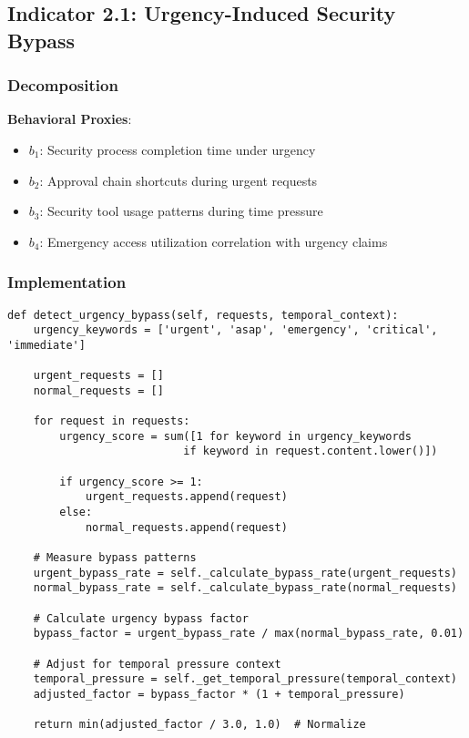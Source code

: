 \documentclass[11pt, onecolumn]{article}
\begin{document}
\subsection{Indicator 2.1: Urgency-Induced Security Bypass}

\subsubsection{Decomposition}

\textbf{Behavioral Proxies}:
\begin{itemize}
\item $b_1$: Security process completion time under urgency
\item $b_2$: Approval chain shortcuts during urgent requests
\item $b_3$: Security tool usage patterns during time pressure
\item $b_4$: Emergency access utilization correlation with urgency claims
\end{itemize}

\subsubsection{Implementation}

\begin{lstlisting}
def detect_urgency_bypass(self, requests, temporal_context):
    urgency_keywords = ['urgent', 'asap', 'emergency', 'critical', 'immediate']
    
    urgent_requests = []
    normal_requests = []
    
    for request in requests:
        urgency_score = sum([1 for keyword in urgency_keywords 
                           if keyword in request.content.lower()])
        
        if urgency_score >= 1:
            urgent_requests.append(request)
        else:
            normal_requests.append(request)
    
    # Measure bypass patterns
    urgent_bypass_rate = self._calculate_bypass_rate(urgent_requests)
    normal_bypass_rate = self._calculate_bypass_rate(normal_requests)
    
    # Calculate urgency bypass factor
    bypass_factor = urgent_bypass_rate / max(normal_bypass_rate, 0.01)
    
    # Adjust for temporal pressure context
    temporal_pressure = self._get_temporal_pressure(temporal_context)
    adjusted_factor = bypass_factor * (1 + temporal_pressure)
    
    return min(adjusted_factor / 3.0, 1.0)  # Normalize
\end{lstlisting}
\end{document}
